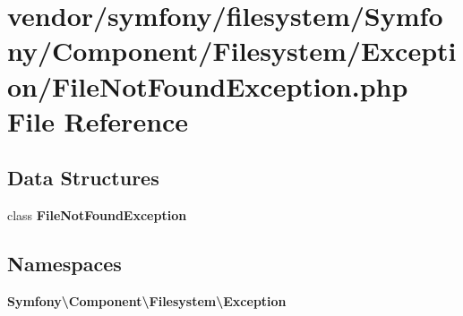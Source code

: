 \section{vendor/symfony/filesystem/\+Symfony/\+Component/\+Filesystem/\+Exception/\+File\+Not\+Found\+Exception.php File Reference}
\label{symfony_2filesystem_2_symfony_2_component_2_filesystem_2_exception_2_file_not_found_exception_8php}
\subsection*{Data Structures}
\begin{DoxyCompactItemize}
\item 
class {\bf File\+Not\+Found\+Exception}
\end{DoxyCompactItemize}
\subsection*{Namespaces}
\begin{DoxyCompactItemize}
\item 
 {\bf Symfony\textbackslash{}\+Component\textbackslash{}\+Filesystem\textbackslash{}\+Exception}
\end{DoxyCompactItemize}
